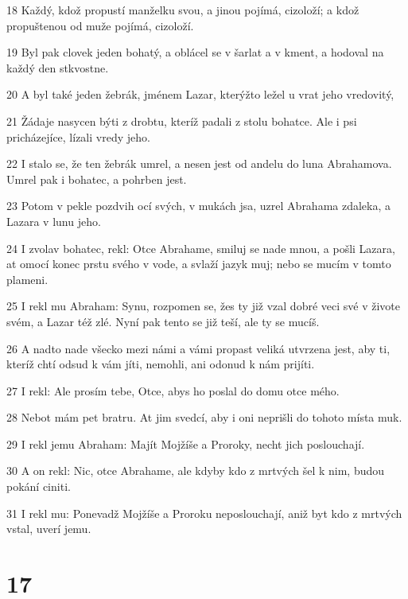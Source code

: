 \par 18 Každý, kdož propustí manželku svou, a jinou pojímá, cizoloží; a kdož propuštenou od muže pojímá, cizoloží.
\par 19 Byl pak clovek jeden bohatý, a oblácel se v šarlat a v kment, a hodoval na každý den stkvostne.
\par 20 A byl také jeden žebrák, jménem Lazar, kterýžto ležel u vrat jeho vredovitý,
\par 21 Žádaje nasycen býti z drobtu, kteríž padali z stolu bohatce. Ale i psi pricházejíce, lízali vredy jeho.
\par 22 I stalo se, že ten žebrák umrel, a nesen jest od andelu do luna Abrahamova. Umrel pak i bohatec, a pohrben jest.
\par 23 Potom v pekle pozdvih ocí svých, v mukách jsa, uzrel Abrahama zdaleka, a Lazara v lunu jeho.
\par 24 I zvolav bohatec, rekl: Otce Abrahame, smiluj se nade mnou, a pošli Lazara, at omocí konec prstu svého v vode, a svlaží jazyk muj; nebo se mucím v tomto plameni.
\par 25 I rekl mu Abraham: Synu, rozpomen se, žes ty již vzal dobré veci své v živote svém, a Lazar též zlé. Nyní pak tento se již teší, ale ty se mucíš.
\par 26 A nadto nade všecko mezi námi a vámi propast veliká utvrzena jest, aby ti, kteríž chtí odsud k vám jíti, nemohli, ani odonud k nám prijíti.
\par 27 I rekl: Ale prosím tebe, Otce, abys ho poslal do domu otce mého.
\par 28 Nebot mám pet bratru. At jim svedcí, aby i oni neprišli do tohoto místa muk.
\par 29 I rekl jemu Abraham: Majít Mojžíše a Proroky, necht jich poslouchají.
\par 30 A on rekl: Nic, otce Abrahame, ale kdyby kdo z mrtvých šel k nim, budou pokání ciniti.
\par 31 I rekl mu: Ponevadž Mojžíše a Proroku neposlouchají, aniž byt kdo z mrtvých vstal, uverí jemu.

\chapter{17}

